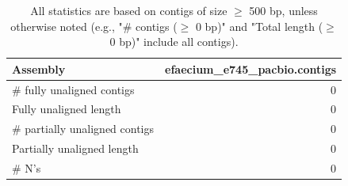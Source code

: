 \documentclass[12pt,a4paper]{article}
\begin{document}
\begin{table}[ht]
\begin{center}
\caption{All statistics are based on contigs of size $\geq$ 500 bp, unless otherwise noted (e.g., "\# contigs ($\geq$ 0 bp)" and "Total length ($\geq$ 0 bp)" include all contigs).}
\begin{tabular}{|l*{1}{|r}|}
\hline
Assembly & efaecium\_e745\_pacbio.contigs \\ \hline
\# fully unaligned contigs & 0 \\ \hline
Fully unaligned length & 0 \\ \hline
\# partially unaligned contigs & 0 \\ \hline
Partially unaligned length & 0 \\ \hline
\# N's & 0 \\ \hline
\end{tabular}
\end{center}
\end{table}
\end{document}
